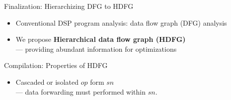 \documentclass{beamer}
\begin{document}
\begin{CJK}{UTF8}{bkai}
    \begin{frame}{Finalization: Hierarchizing DFG to HDFG}
        \begin{itemize}
            \item Conventional DSP program analysis: data flow graph (DFG) analysis
            \item We propose \textbf{Hierarchical data flow graph (HDFG)} \\
                    --- providing abundant information for optimizations
        \end{itemize}
        \begin{figure}[!ht]
            \begin{center}
            \end{center}
        \end{figure}
    \end{frame}
    \begin{frame}{Compilation: Properties of HDFG}
        \begin{itemize}
            \item Cascaded or isolated $op$ form $sn$ \\ --- data forwarding must performed within $sn$.

\end{itemize}
\end{frame}
\end{CJK}
\end{document}
